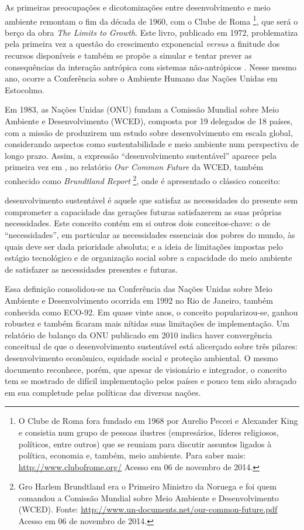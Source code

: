 As primeiras preocupações e dicotomizações entre desenvolvimento e meio ambiente remontam o fim da década de 1960, com o Clube de Roma
\footnote{O Clube de Roma fora fundado em 1968 por Aurelio Peccei e Alexander King e consistia num grupo de pessoas ilustres (empresários, líderes religiosos, políticos, entre outros) que se reuniam para discutir assuntos ligados à política, economia e, também, meio ambiente. Para saber mais: \url{http://www.clubofrome.org/} Acesso em 06 de novembro de 2014.}, que será o berço da obra \emph{The Limits to Growth}. Este livro, publicado em 1972, problematiza pela primeira vez a questão do crescimento exponencial \emph{versus} a finitude dos recursos disponíveis e também se propõe a simular e tentar prever as consequências da interação antrópica com sistemas não-antrópicos \cite{MEADOWS1972}. Nesse mesmo ano, ocorre a Conferência sobre o Ambiente Humano das Nações Unidas em Estocolmo.

Em 1983, as Nações Unidas (ONU) fundam a Comissão Mundial sobre Meio Ambiente e Desenvolvimento (WCED), composta por 19 delegados de 18 países, com a missão de produzirem um estudo sobre desenvolvimento em escala global, considerando aspectos como sustentabilidade e meio ambiente num perspectiva de longo prazo. Assim, a expressão ``desenvolvimento sustentável'' aparece pela primeira vez em \citeyear{WCED1987}, no relatório \emph{Our Common Future} da WCED, também conhecido como \emph{Brundtland Report} 
\footnote{Gro Harlem Brundtland era o Primeiro Ministro da Noruega e foi quem comandou a Comissão Mundial sobre Meio Ambiente e Desenvolvimento (WCED). Fonte: \url{http://www.un-documents.net/our-common-future.pdf} Acesso em 06 de novembro de 2014.}, onde é apresentado o clássico conceito:

\begin{citacao}
desenvolvimento sustentável é aquele que satisfaz as necessidades do presente sem comprometer a capacidade das gerações futuras satisfazerem as suas próprias necessidades. Este conceito contém em si outros dois conceitos-chave: o de ``necessidades'', em particular as necessidades essenciais dos pobres do mundo, às quais deve ser dada prioridade absoluta; e a ideia de limitações impostas pelo estágio tecnológico e de organização social sobre a capacidade do meio ambiente de satisfazer as necessidades presentes e futuras. 
\cite[p.41]{WCED1987}
\end{citacao}   

Essa definição consolidou-se na Conferência das Nações Unidas sobre Meio Ambiente e Desenvolvimento ocorrida em 1992 no Rio de Janeiro, também conhecida como ECO-92. Em quase vinte anos, o conceito popularizou-se, ganhou robustez e também ficaram mais nítidas suas limitações de implementação. Um relatório de balanço da ONU publicado em 2010 \cite{ONU2010} indica haver convergência conceitual de que o desenvolvimento sustentável está alicerçado sobre três pilares: desenvolvimento econômico, equidade social e proteção ambiental. O mesmo documento reconhece, porém, que apesar de visionário e integrador, o conceito tem se mostrado de difícil implementação pelos países e pouco tem sido abraçado em sua completude pelas políticas das diversas nações. 

